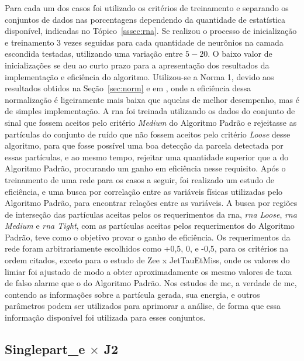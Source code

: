Para cada um dos casos foi utilizado os critérios de treinamento e separando os 
conjuntos de dados nas porcentagens dependendo da quantidade de estatística
disponível, indicadas no Tópico~\ref{sssec:rna}. Se realizou o processo de
inicialização e treinamento 3 vezes seguidas para cada quantidade de neurônios na camada
escondida testadas, utilizando uma variação entre $5-20$. O baixo valor de
inicializações se deu ao curto prazo para a apresentação dos resultados da
implementação e eficiência do algoritmo. 
Utilizou-se a Norma 1,
devido aos resultados obtidos na Seção~\ref{sec:norm} e em \cite{tese_torres},
onde a eficiência dessa normalização é ligeiramente mais baixa que aquelas de
melhor desempenho, mas é de simples implementação. A \gls{rna} foi treinada utilizando os
dados do conjunto de sinal que fossem aceitos pelo critério \emph{Medium} do
Algoritmo Padrão e rejeitasse as partículas do conjunto de ruído que não fossem
aceitos pelo critério \emph{Loose} desse algoritmo, para que fosse possível uma
boa detecção da parcela detectada por essas partículas, e ao mesmo tempo,
rejeitar uma quantidade superior que a do Algoritmo Padrão, procurando um ganho em
eficiência nesse requisito. Após o treinamento de uma rede para os casos a seguir,
foi realizado um estudo de eficiência, e uma busca por correlação
entre as variáveis físicas utilizadas pelo Algoritmo Padrão, para encontrar relações entre as
variáveis. A busca por regiões de interseção das partículas aceitas pelos os
requerimentos da \gls{rna}, \emph{\gls{rna} Loose}, \emph{\gls{rna} Medium} e
\emph{\gls{rna} Tight}, com as partículas aceitas pelos requerimentos do
Algoritmo Padrão, teve como o objetivo provar o ganho de eficiência. Os
requerimentos da rede foram arbitrariamente escolhidos como +0,5, 0, e -0,5,
para os critérios na ordem citados, exceto para o estudo de Zee x JetTauEtMiss,
onde os valores do limiar foi ajustado de modo a obter aproximadamente os mesmo
valores de taxa de falso alarme que o do Algoritmo Padrão. Nos estudos
de \gls{mc}, a verdade de \gls{mc}, contendo as informações sobre a partícula
gerada, sua energia, e outros parâmetros podem ser utilizados para aprimorar a
análise, de forma que essa informação disponível foi utilizada para esses
conjuntos.


\FloatBarrier

\subsection{\texorpdfstring{Singlepart\_e $\times$ J2}{Singlepart\_e x J2}}
\label{ssec:single_e}

